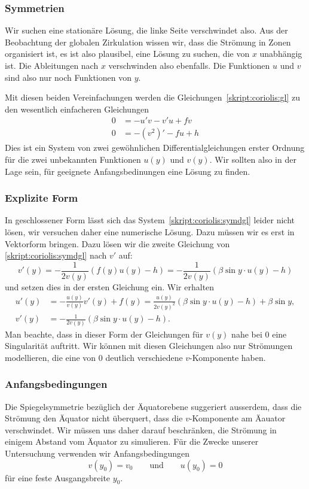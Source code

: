 \subsubsection{Symmetrien}
Wir suchen eine stationäre Lösung, die linke Seite verschwindet also.
Aus der Beobachtung der globalen Zirkulation wissen wir, dass die
Strömung in Zonen organisiert ist, es ist also plausibel, eine
Lösung zu suchen, die von $x$ unabhängig ist.
Die Ableitungen nach $x$ verschwinden also ebenfalls.
Die Funktionen $u$ und $v$ sind also nur noch Funktionen von $y$.

Mit diesen beiden Vereinfachungen werden die
Gleichungen~\eqref{skript:coriolis:gl} zu den wesentlich einfacheren
Gleichungen
\begin{equation}
\begin{aligned}
0&=-u'v-v'u+fv
\\
0&=-(v^2)' - fu +h
\end{aligned}
\label{skript:coriolis:symdgl}
\end{equation}
Dies ist ein System von zwei gewöhnlichen Differentialgleichungen
erster Ordnung für die zwei unbekannten Funktionen $u(y)$ und $v(y)$.
Wir sollten also in der Lage sein, für geeignete Anfangsbedinungen eine 
Lösung zu finden.

\subsubsection{Explizite Form}
In geschlossener Form lässt sich das System~\eqref{skript:coriolis:symdgl}
leider nicht lösen, wir versuchen daher eine numerische Lösung.
Dazu müssen wir es erst in Vektorform bringen.
Dazu lösen wir die zweite Gleichung von \eqref{skript:coriolis:symdgl}
nach $v'$ auf:
\[
v'(y)
=
-\frac{1}{2v(y)}(f(y)u(y)-h)
=
-\frac{1}{2v(y)}(\beta\sin y\cdot u(y)-h)
\]
und setzen dies in der ersten Gleichung ein.
Wir erhalten
\begin{align}
u'(y)
&=
-\frac{u(y)}{v(y)}v'(y)+f(y)
=
\frac{u(y)}{2v(y)^2} (\beta\sin y\cdot u(y)-h) + \beta \sin y,
\label{skript:coriolis:udgl}
\\
v'(y)
&=
-\frac{1}{2v(y)}(\beta\sin y\cdot u(y)-h).
\label{skript:coriolis:vdgl}
\end{align}
Man beachte, dass in dieser Form der Gleichungen für $v(y)$ nahe bei $0$
eine Singularität auftritt.
Wir können mit diesen Gleichungen also nur Strömungen modellieren, die
eine von $0$ deutlich verschiedene $v$-Komponente haben.

\subsubsection{Anfangsbedingungen}
Die Spiegelsymmetrie bezüglich der Äquatorebene suggeriert ausserdem, dass
die Strömung den Äquator nicht überquert, dass die $v$-Komponente
am Äauator verschwindet.
Wir müssen uns daher darauf beschränken, die Strömung in einigem
Abstand vom Äquator zu simulieren.
Für die Zwecke unserer Untersuchung verwenden wir Anfangsbedingungen
\[
v(y_0)=v_0
\qquad
\text{und}
\qquad
u(y_0)=0
\]
für eine feste Ausgangsbreite $y_0$.

